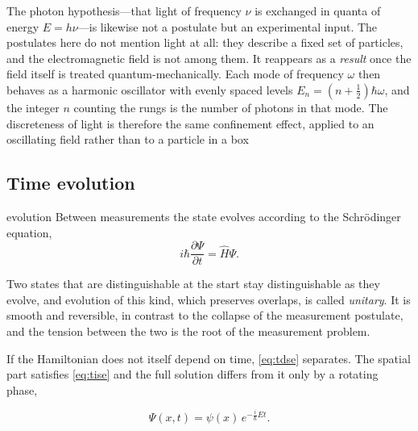         The photon hypothesis---that light of frequency $\nu$ is exchanged in quanta of energy $E = h\nu$---is likewise not a postulate but an experimental input. The postulates here do not mention light at all: they describe a fixed set of particles, and the electromagnetic field is not among them. It reappears as a \emph{result} once the field itself is treated quantum-mechanically. Each mode of frequency $\omega$ then behaves as a harmonic oscillator with evenly spaced levels $E_{n} = \left(n + \tfrac{1}{2}\right)\hbar\omega$, and the integer $n$ counting the rungs is the number of photons in that mode. The discreteness of light is therefore the same confinement effect, applied to an oscillating field rather than to a particle in a box

    \subsection{Time evolution}

        \begin{postulate}{evolution}
            Between measurements the state evolves according to the Schrödinger equation,
            \begin{equation}\label{eq:tdse}
                i\hbar\frac{\partial \Psi}{\partial t} = \hat{H}\Psi .
            \end{equation}
        \end{postulate}

        Two states that are distinguishable at the start stay distinguishable as they evolve, and evolution of this kind, which preserves overlaps, is called \emph{unitary}. It is smooth and reversible, in contrast to the collapse of the measurement postulate, and the tension between the two is the root of the measurement problem.

        If the Hamiltonian does not itself depend on time, \cref{eq:tdse} separates. The spatial part satisfies \cref{eq:tise} and the full solution differs from it only by a rotating phase,

        \begin{equation}\label{eq:stationary}
            \Psi(x,t) = \psi(x)\,e^{-\frac{i}{\hbar}Et} .
        \end{equation}

